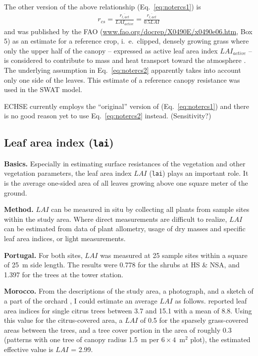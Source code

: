 \documentclass{scrreprt}
\begin{document}
The other version of the above relationship (Eq.~\ref{eq:notercs1}) is
\begin{align} \label{eq:notercs2}
  r_{cs} = \frac{\overline{r_{l,act}}}{LAI_{active}} = \frac{\overline{r_{l,act}}}{0.5 LAI}
\end{align}
%
and was published by the FAO (\url{www.fao.org/docrep/X0490E/x0490e06.htm}, Box 5) as an estimate for a reference crop, i.\ e.\ clipped, densely growing grass where only the upper half of the canopy -- expressed as active leaf area index $LAI_{active}$ -- is considered to contribute to mass and heat transport toward the atmosphere \citep{fao98}.
The underlying assumption in Eq.~\eqref{eq:notercs2} apparently takes into account only one side of the leaves.
This estimate of a reference canopy resistance was used in the SWAT model.

ECHSE currently employs the ``original'' version of \citet{shuttleworth85} (Eq.~\ref{eq:notercs1}) and there is no good reason yet to use Eq.~\eqref{eq:notercs2} instead.
(Sensitivity?)

\newpage
\subsection{Leaf area index (\texttt{lai})} \label{ssec:parest_veg_lai}

\textbf{Basics.}
Especially in estimating surface resistances of the vegetation and other vegetation parameters, the leaf area index $LAI$ (\verb!lai!) plays an important role.
It is the average one-sided area of all leaves growing above one square meter of the ground.

\noindent
\textbf{Method.}
$LAI$ can be measured in situ by collecting all plants from sample sites within the study area.
Where direct measurements are difficult to realize, $LAI$ can be estimated from data of plant allometry, usage of dry masses and specific leaf area indices, or light measurements.

\noindent
\textbf{Portugal.}
For both sites, $LAI$ was measured at 25 sample sites within a square of 25~m side length.
The results were 0.778 for the shrubs at HS \& NSA, and 1.397 for the trees at the tower station.

\noindent
\textbf{Morocco.}
From the descriptions of the study area, a photograph, and a sketch of a part of the orchard \citep{mroos14}, I could estimate an average $LAI$ as follows.
\citet{jahn79} reported leaf area indices for single citrus trees between 3.7 and 15.1 with a mean of 8.8.
Using this value for the citrus-covered area, a $LAI$ of 0.5 for the sparsely grass-covered areas between the trees, and a tree cover portion in the area of roughly 0.3 (patterns with one tree of canopy radius 1.5~m per $6 \times 4$~m$^2$ plot), the estimated effective value is $LAI$ = 2.99.
\end{document}
